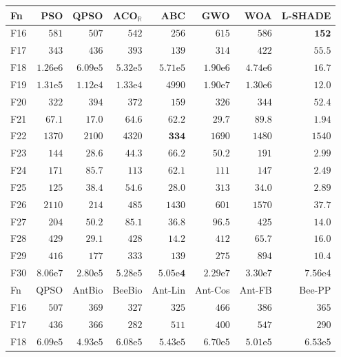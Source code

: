 \begin{tabular}{lrrrrrrr}
\toprule
Fn & PSO & QPSO & ACO$_\mathbb{R}$ & ABC & GWO & WOA & L-SHADE \\
\midrule
F16 & $581$ & $507$ & $542$ & $256$ & $615$ & $586$ & $\mathbf{152}$ \\
F17 & $343$ & $436$ & $393$ & $139$ & $314$ & $422$ & $\mathbf{55.5}$ \\
F18 & $1.26\mathrm{e}{6}$ & $6.09\mathrm{e}{5}$ & $5.32\mathrm{e}{5}$ & $5.71\mathrm{e}{5}$ & $1.90\mathrm{e}{6}$ & $4.74\mathrm{e}{6}$ & $\mathbf{16.7}$ \\
F19 & $1.31\mathrm{e}{5}$ & $1.12\mathrm{e}{4}$ & $1.33\mathrm{e}{4}$ & $4990$ & $1.90\mathrm{e}{7}$ & $1.30\mathrm{e}{6}$ & $\mathbf{12.0}$ \\
F20 & $322$ & $394$ & $372$ & $159$ & $326$ & $344$ & $\mathbf{52.4}$ \\
F21 & $67.1$ & $17.0$ & $64.6$ & $62.2$ & $29.7$ & $89.8$ & $\mathbf{1.94}$ \\
F22 & $1370$ & $2100$ & $4320$ & $\mathbf{334}$ & $1690$ & $1480$ & $1540$ \\
F23 & $144$ & $28.6$ & $44.3$ & $66.2$ & $50.2$ & $191$ & $\mathbf{2.99}$ \\
F24 & $171$ & $85.7$ & $113$ & $62.1$ & $111$ & $147$ & $\mathbf{2.49}$ \\
F25 & $125$ & $38.4$ & $54.6$ & $28.0$ & $313$ & $34.0$ & $\mathbf{2.89}$ \\
F26 & $2110$ & $214$ & $485$ & $1430$ & $601$ & $1570$ & $\mathbf{37.7}$ \\
F27 & $204$ & $50.2$ & $85.1$ & $36.8$ & $96.5$ & $425$ & $\mathbf{14.0}$ \\
F28 & $429$ & $29.1$ & $428$ & $14.2$ & $412$ & $65.7$ & $16.0$ \\
F29 & $416$ & $177$ & $333$ & $139$ & $275$ & $894$ & $\mathbf{10.4}$ \\
F30 & $8.06\mathrm{e}{7}$ & $2.80\mathrm{e}{5}$ & $5.28\mathrm{e}{5}$ & $\mathbf{5.05\mathrm{e}{4}}$ & $2.29\mathrm{e}{7}$ & $3.30\mathrm{e}{7}$ & $7.56\mathrm{e}{4}$ \\
\midrule
Fn & QPSO & AntBio & BeeBio & Ant-Lin & Ant-Cos & Ant-FB & Bee-PP \\
\midrule
F16 & $507$ & $369$ & $327$ & $325$ & $466$ & $386$ & $365$ \\
F17 & $436$ & $366$ & $282$ & $511$ & $400$ & $547$ & $290$ \\
F18 & $6.09\mathrm{e}{5}$ & $4.93\mathrm{e}{5}$ & $6.08\mathrm{e}{5}$ & $5.43\mathrm{e}{5}$ & $6.70\mathrm{e}{5}$ & $5.01\mathrm{e}{5}$ & $6.53\mathrm{e}{5}$ \\

\end{tabular}
